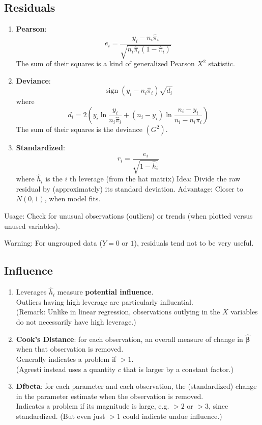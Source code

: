 \documentclass[11pt]{elegantbook}
\begin{document}
\subsection{Residuals}
\begin{definition}[Residuals]
\normalfont
\begin{enumerate}
    \item \textbf{Pearson}:
    $$
    e_i=\frac{y_i-n_i \hat{\pi}_i}{\sqrt{n_i \hat{\pi}_i\left(1-\hat{\pi}_i\right)}}
    $$
    The sum of their squares is a kind of generalized Pearson $X^2$ statistic.
    \item \textbf{Deviance}:
    $$
    \operatorname{sign}\left(y_i-n_i \hat{\pi}_i\right) \sqrt{d_i}
    $$
    where
    $$
    d_i=2\left(y_i \ln \frac{y_i}{n_i \hat{\pi}_i}+\left(n_i-y_i\right) \ln \frac{n_i-y_i}{n_i-n_i \hat{\pi}_i}\right)
    $$
    The sum of their squares is the deviance $\left(G^2\right)$.
    \item \textbf{Standardized}:
    $$
    r_i=\frac{e_i}{\sqrt{1-\hat{h}_i}}
    $$
    where $\hat{h}_i$ is the $i$ th leverage (from the hat matrix)
    Idea: Divide the raw residual by (approximately) its standard deviation.
    Advantage: Closer to $N(0,1)$, when model fits.
\end{enumerate}
\end{definition}
Usage: Check for unusual observations (outliers) or trends (when plotted versus unused variables).

Warning: For ungrouped data ($Y=0$ or $1$), residuals tend not to be very useful.


\subsection{Influence}
\begin{enumerate}[$\bullet$]
    \item Leverages $\hat{h}_i$ measure \textbf{potential influence}.\\
    Outliers having high leverage are particularly influential.\\
    (Remark: Unlike in linear regression, observations outlying in the $X$ variables do not necessarily have high leverage.)
    \item \textbf{Cook's Distance}: for each observation, an overall measure of change in $\hat{\boldsymbol{\beta}}$ when that observation is removed.\\
    Generally indicates a problem if $>1$.\\
    (Agresti instead uses a quantity $c$ that is larger by a constant factor.)
    \item \textbf{Dfbeta}: for each parameter and each observation, the (standardized) change in the parameter estimate when the observation is removed.\\
    Indicates a problem if its magnitude is large, e.g. $> 2$ or $> 3$, since standardized. (But even just $> 1$ could indicate undue influence.)
\end{enumerate}
\end{document}

